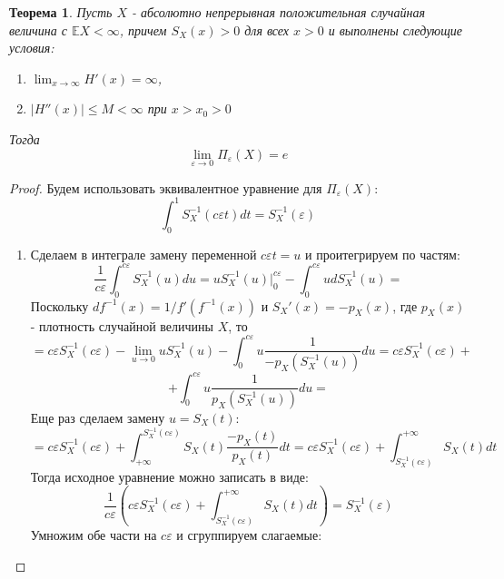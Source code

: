 \documentclass[12pt]{article}
\theoremstyle{plain}
\newtheorem{theorem}{Теорема}[section]
\theoremstyle{definition}
\theoremstyle{remark}
\begin{document}
\begin{theorem}
    Пусть $X$ - абсолютно непрерывная положительная случайная величина с $\mathbb{E}X < \infty$, причем $S_X(x) > 0$ для всех $x > 0$ и выполнены следующие условия:
    \begin{enumerate}
        \item $\lim_{x\to \infty}H'(x) = \infty$,
        \item $|H''(x)| \leq M < \infty$ при $x > x_0 > 0$
    \end{enumerate}
    Тогда
    \[
        \lim_{\varepsilon \to 0}\Pi_\varepsilon(X) = e
    \]
\end{theorem}
\begin{proof}
    Будем использовать эквивалентное уравнение для $\Pi_\varepsilon(X)$:
    \[
        \int_0^1S_X^{-1}(c\varepsilon t)dt = S_X^{-1}(\varepsilon)
    \]
    \begin{enumerate}
        \item 
    
    Сделаем в интеграле замену переменной $c\varepsilon t = u$ и проитегрируем по частям:
    \[
        \frac{1}{c\varepsilon}\int_0^{c\varepsilon}S_X^{-1}(u)du = uS_X^{-1}(u)\bigg|_0^{c\varepsilon} - \int_0^{c\varepsilon}udS_X^{-1}(u) \boxed{=}
    \]
    Поскольку $df^{-1}(x) = 1/f'(f^{-1}(x))$ и $S_X'(x)= - p_X(x)$, где $p_X(x)$ - плотность случайной величины $X$,  то
    \[
        \boxed{=} c\varepsilon S_X^{-1}(c\varepsilon) - \lim_{u \to 0}uS_X^{-1}(u) - \int_0^{c\varepsilon}u\frac{1}{-p_X(S_X^{-1}(u))}du = c\varepsilon S_X^{-1}(c\varepsilon) + 
    \]
    \[
        + \int_0^{c\varepsilon}u\frac{1}{p_X(S_X^{-1}(u))}du \boxed{=} 
    \]
    Еще раз сделаем замену $u = S_X(t)$:
    \[
        \boxed{=} c\varepsilon S_X^{-1}(c\varepsilon) + \int_{+\infty}^{S_X^{-1}(c\varepsilon)}S_X(t)\frac{-p_X(t)}{p_X(t)}dt = c\varepsilon S_X^{-1}(c\varepsilon) + \int^{+\infty}_{S_X^{-1}(c\varepsilon)}S_X(t)dt
    \]
    Тогда исходное уравнение можно записать в виде:
    \[
        \frac{1}{c\varepsilon}(c\varepsilon S_X^{-1}(c\varepsilon) + \int^{+\infty}_{S_X^{-1}(c\varepsilon)}S_X(t)dt) = S_X^{-1}(\varepsilon)
    \]
    Умножим обе части на $c\varepsilon$ и сгруппируем слагаемые:
    

\end{enumerate}
\end{proof}
\end{document}
